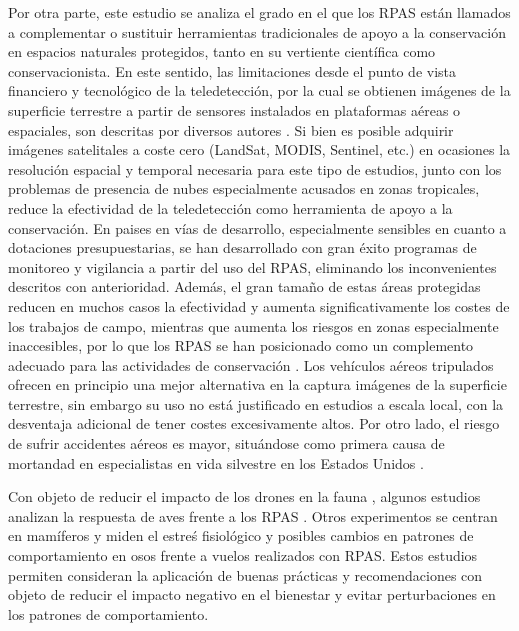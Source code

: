 \documentclass[11pt,]{article}
\begin{document}
Por otra parte, este estudio se analiza el grado en el que los RPAS
están llamados a complementar o sustituir herramientas tradicionales de
apoyo a la conservación en espacios naturales protegidos, tanto en su
vertiente científica como conservacionista. En este sentido, las
limitaciones desde el punto de vista financiero y tecnológico de la
teledetección, por la cual se obtienen imágenes de la superficie
terrestre a partir de sensores instalados en plataformas aéreas o
espaciales, son descritas por diversos autores \citep{Koh2012}. Si bien
es posible adquirir imágenes satelitales a coste cero (LandSat, MODIS,
Sentinel, etc.) en ocasiones la resolución espacial y temporal necesaria
para este tipo de estudios, junto con los problemas de presencia de
nubes especialmente acusados en zonas tropicales, reduce la efectividad
de la teledetección como herramienta de apoyo a la conservación. En
paises en vías de desarrollo, especialmente sensibles en cuanto a
dotaciones presupuestarias, se han desarrollado con gran éxito programas
de monitoreo y vigilancia a partir del uso del RPAS, eliminando los
inconvenientes descritos con anterioridad. Además, el gran tamaño de
estas áreas protegidas reducen en muchos casos la efectividad y aumenta
significativamente los costes de los trabajos de campo, mientras que
aumenta los riesgos en zonas especialmente inaccesibles, por lo que los
RPAS se han posicionado como un complemento adecuado para las
actividades de conservación \citep{Zahawi2015}. Los vehículos aéreos
tripulados ofrecen en principio una mejor alternativa en la captura
imágenes de la superficie terrestre, sin embargo su uso no está
justificado en estudios a escala local, con la desventaja adicional de
tener costes excesivamente altos. Por otro lado, el riesgo de sufrir
accidentes aéreos es mayor, situándose como primera causa de mortandad
en especialistas en vida silvestre en los Estados Unidos
\citep{Sasse2003}.

Con objeto de reducir el impacto de los drones en la fauna , algunos
estudios analizan la respuesta de aves frente a los RPAS
\citep{Vas2015}. Otros experimentos se centran en mamíferos y miden el
estreś fisiológico y posibles cambios en patrones de comportamiento en
osos frente a vuelos realizados con RPAS\citep{Ditmer2015}. Estos
estudios permiten consideran la aplicación de buenas prácticas y
recomendaciones con objeto de reducir el impacto negativo en el
bienestar y evitar perturbaciones en los patrones de comportamiento.
\end{document}
